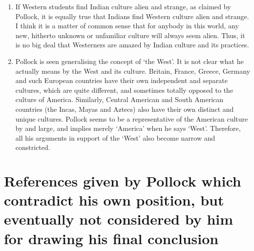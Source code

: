 \begin{enumerate}
\item If Western students find Indian culture alien and strange, as claimed by Pollock, it is equally true that Indians find Western culture alien and strange. I think it is a matter of common sense that for anybody in this world, any new, hitherto unknown or unfamiliar culture will always seem alien. Thus, it is no big deal that Westerners are amazed by Indian culture and its practices.

\item Pollock is seen generalising the concept of `the West'. It is not clear what he actually means by the West and its culture. Britain, France, Greece, Germany and such European countries have their own independent and separate cultures, which are quite different, and sometimes totally opposed to the culture of America. Similarly, Central American and South American countries (the Incas, Mayas and Aztecs) also have their own distinct and unique cultures. Pollock seems to be a representative of the American culture by and large, and implies merely `America' when he says `West'. Therefore, all his arguments in support of the `West' also become narrow and constricted. 
\end{enumerate}

\newpage

\section*{References given by Pollock which contradict his own position, but eventually not considered by him for drawing his final conclusion}

